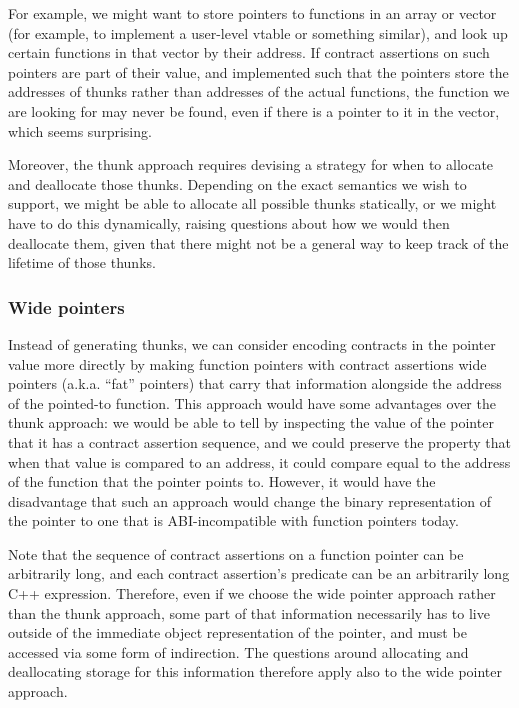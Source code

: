 For example, we might want to store pointers to functions in an array or vector (for example, to implement a user-level vtable or something similar), and look up certain functions in that vector by their address. If contract assertions on such pointers are part of their value, and implemented such that the pointers store the addresses of thunks rather than addresses of the actual functions, the function we are looking for may never be found, even if there is a pointer to it in the vector, which seems surprising.


Moreover, the thunk approach requires devising a strategy for when to allocate and deallocate those thunks. Depending on the exact semantics we wish to support, we might be able to allocate all possible thunks statically, or we might have to do this dynamically, raising questions about how we would then deallocate them, given that there might not be a general way to keep track of the lifetime of those thunks.


\subsubsection{Wide pointers}

Instead of generating thunks, we can consider encoding contracts in the pointer value more directly by making function pointers with contract assertions wide pointers (a.k.a. ``fat'' pointers) that carry that information alongside the address of the pointed-to function. This approach would have some advantages over the thunk approach: we would be able to tell by inspecting the value of the pointer that it has a contract assertion sequence, and we could preserve the property that when that value is compared to an address, it could compare equal to the address of the function that the pointer points to. However, it would have the disadvantage that such an approach would change the binary representation of the pointer to one that is ABI-incompatible with function pointers today.

Note that the sequence of contract assertions on a function pointer can be arbitrarily long, and each contract assertion's predicate can be an arbitrarily long C++ expression. Therefore, even if we choose the wide pointer approach rather than the thunk approach, some part of that information necessarily has to live outside of the immediate object representation of the pointer, and must be accessed via some form of indirection. The questions around allocating and deallocating storage for this information therefore apply also to the wide pointer approach.

